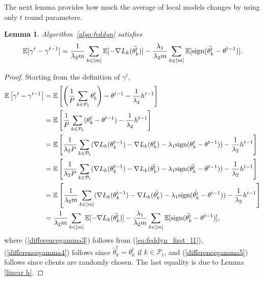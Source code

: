 \documentclass{article} %
\newtheorem{lemma}[theorem]{Lemma}
\begin{document}
The next lemma provides how much the average of local models changes by using only $t$ round parameters.
\begin{lemma}\label{differencegamma}
Algorithm~\ref{algo:feddyn} satisfies 
\begin{equation*}
    \mathbb{E}[\gamma^t-\gamma^{t-1}] = \frac{1}{\lambda_2 m}\sum_{k\in [m]}\mathbb{E}[-\nabla L_k(\Tilde{\theta_k^t})] -\frac{\lambda_1}{\lambda_2 m}\sum_{k\in [m]}\mathbb{E}[\mathrm{sign}(\Tilde{\theta_k^t}-\theta^{t-1})].
\end{equation*}
\end{lemma}
\begin{proof}
Starting from the definition of $\gamma^t$,
\begin{align}
    \mathbb{E} \left[\gamma^t-\gamma^{t-1} \right] &= \mathbb{E}\left[ \left(\frac{1}{P}\sum_{k\in \mathcal{P}_t}\theta_k^t \right)-\theta^{t-1}-\frac{1}{\lambda_2}h^{t-1} \right] \nonumber \\
    &= \mathbb{E}\left[\frac{1}{P}\sum_{k\in \mathcal{P}_t}(\theta_k^t-\theta^{t-1})-\frac{1}{\lambda_2}h^{t-1} \right] \nonumber \\
    &\label{differencegamma3} = \mathbb{E}\left[\frac{1}{\lambda_2 P}\sum_{k\in \mathcal{P}_t}(\nabla L_k(\theta_k^{t-1})-\nabla L_k(\theta_k^t)-\lambda_1 \mathrm{sign}(\theta_k^t-\theta^{t-1}))-\frac{1}{\lambda_2}h^{t-1} \right] \\
    &\label{differencegamma4} = \mathbb{E}\left[\frac{1}{\lambda_2 P}\sum_{k\in \mathcal{P}_t}(\nabla L_k(\theta_k^{t-1})-\nabla L_k(\Tilde{\theta_k^t})-\lambda_1 \mathrm{sign}(\Tilde{\theta_k^t}-\theta^{t-1}))-\frac{1}{\lambda_2}h^{t-1}\right]\\
    &\label{differencegamma5} = \mathbb{E}\left[\frac{1}{\lambda_2 m}\sum_{k\in [m]}(\nabla L_k(\theta_k^{t-1})-\nabla L_k(\Tilde{\theta_k^t})-\lambda_1 \mathrm{sign}(\Tilde{\theta_k^t}-\theta^{t-1}))-\frac{1}{\lambda_2}h^{t-1} \right]\\
    &\label{differencegamma6} = \frac{1}{\lambda_2 m}\sum_{k\in [m]}\mathbb{E}[-\nabla L_k(\Tilde{\theta_k^t})]-\frac{\lambda_1}{\lambda_2 m}\sum_{k\in [m]}\mathbb{E}[\mathrm{sign}(\Tilde{\theta_k^t}-\theta^{t-1})],
\end{align}
where (\ref{differencegamma3}) follows from (\ref{eq:feddyn_first_l1}), (\ref{differencegamma4}) follows since $\tilde{\theta}_k^t=\theta_k^t$ if $k\in\mathcal{P}_t$, and (\ref{differencegamma5}) follows since clients are randomly chosen. The last equality is due to Lemma \ref{linear h}.
\end{proof}
\end{document}
